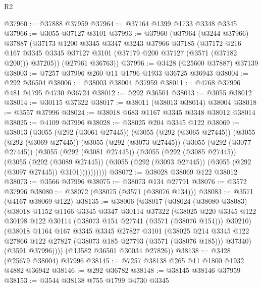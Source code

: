 \begin{lexlean}{R2}
\begin{coremodule}
@37960 := @37888 @37959
@37964 := @37164 @1399 @1733 @3348 @3345
@37966 := @3055 @37127 @3101
@37993 := @37960
    (@37964
      (@3244 @37966)
      @37887
      (@37173
        @1200
        @3345
        @3347
        @3243
        @37966
        @37185
        (@37172
          @216
          @167
          @3345
          @3345
          @37127
          @3101
          (@37179 @200 @37127 (@3571 (@37182 @200)))
          @37205))
      (@27961 @36763))
@37996 := @3428 (@25600 @37887) @37139
@38003 := @7257 @37996 @260 @11 @1796 @1933 @36725 @36943
@38004 := @292 @36504
@38006 := @38003 @38004 @37959
@38011 := @4768 @37996 @481 @1795 @4730 @36724
@38012 := @292 @36501
@38013 := @3055 @38012
@38014 := @30115 @37322
@38017 := @38011 (@38013 @38014) @38004
@38018 := @3557 @37996
@38024 := @38018 @683 @1167 @3345 @3348 @38012 @38014
@38025 := @4109 @37996
@38028 := @38025 @204 @3345 @122
@38069 := @38013
    (@3055
      (@292 (@3061 @27445))
      (@3055
        (@292 (@3065 @27445))
        (@3055
          (@292 (@3069 @27445))
          (@3055
            (@292 (@3073 @27445))
            (@3055
              (@292 (@3077 @27445))
              (@3055
                (@292 (@3081 @27445))
                (@3055
                  (@292 (@3085 @27445))
                  (@3055
                    (@292 (@3089 @27445))
                    (@3055 (@292 (@3093 @27445)) (@3055 (@292 (@3097 @27445)) @3101))))))))))
@38072 := @38028 @38069 @122 @38012
@38073 := @3566 @37996
@38075 := @38073 @134 @27791
@38076 := @3572 @37996
@38080 := @38072 (@38075 (@3571 (@38076 @134)))
@38083 := @3571 (@4167 @38069 @122)
@38135 := @38006
    (@38017
      (@38024
        (@38080 @38083)
        (@38018
          @1152
          @1166
          @3345
          @3347
          @30114
          @37322
          (@38025
            @220
            @3345
            @122
            @30198
            @122
            @30114
            (@38073 @154 @27741 (@3571 (@38076 @154)))
            @30210)
          (@38018
            @1164
            @167
            @3345
            @3345
            @27827
            @3101
            (@38025
              @214
              @3345
              @122
              @27866
              @122
              @27827
              (@38073 @185 @27793 (@3571 (@38076 @185)))
              @37340)
            (@3591 @37996))))
      (@13582 @36501 @30034 @27826))
@38138 := @3428 (@25679 @38004) @37996
@38145 := @7257 @38138 @265 @11 @1800 @1932 @4882 @36942
@38146 := @292 @36782
@38148 := @38145 @38146 @37959
@38153 := @3544 @38138 @755 @1799 @4730 @3345

\end{coremodule}
\end{lexlean}
